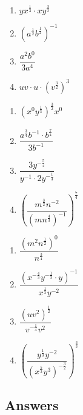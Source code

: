 \begin{multicols}{4}
\begin{enumerate}
\setcounter{enumi}{\value{HW}}

\item $y x^{\frac{1}{3}} \cdot x y^{\frac{3}{2}}$ \label{expexfirst3}
\item $(a^{\frac{1}{2}} b^{\frac{1}{2}})^{- 1}$
\item $\dfrac{a^2 b^0}{3 a^4}$
\item $u v \cdot u \cdot (v^{\frac{3}{2}})^3$

\setcounter{HW}{\value{enumi}}
\end{enumerate}
\end{multicols}
\begin{multicols}{4}
\begin{enumerate}
\setcounter{enumi}{\value{HW}}

\item $(x^0 y^{\frac{1}{3}})_{}^{\frac{3}{2}} x^0$
\item $\dfrac{a^{\frac{3}{4}} b^{- 1} \cdot b^{\frac{7}{4}}}{3 b^{- 1}}$
\item $\dfrac{3 y^{- \frac{5}{4}}}{y^{- 1} \cdot 2 y^{- \frac{1}{3}}}$
\item $\left( \dfrac{m^{\frac{3}{2}} n^{- 2}}{(m n^{\frac{4}{3}})^{- 1}}
  \right)^{\frac{7}{4}}$

\setcounter{HW}{\value{enumi}}
\end{enumerate}
\end{multicols}
\begin{multicols}{4}
\begin{enumerate}
\setcounter{enumi}{\value{HW}}

\item $\dfrac{(m^2 n^{\frac{1}{2}})^0}{n^{\frac{3}{4}}}$
\item $\dfrac{(x^{- \frac{4}{3}} y^{- \frac{1}{3}} \cdot y)^{-
  1}}{x^{\frac{1}{3}} y^{- 2}}$
\item $\dfrac{(u v^2)^{\frac{1}{2}}}{v^{- \frac{1}{4}} v^2}$

\item $\left( \dfrac{y^{ \frac{1}{3}} y^{- 2}}{(x^{\frac{5}{3}} y^3)^{-
  \frac{3}{2}}} \right)^{\frac{3}{2}}$ \label{expexlast3}

\setcounter{HW}{\value{enumi}}
\end{enumerate}
\end{multicols}

\newpage

\subsection{Answers}

